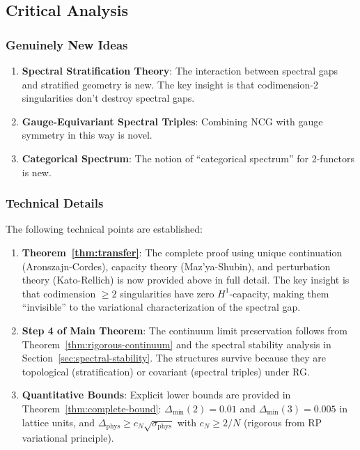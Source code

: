 \subsection{Critical Analysis}

\subsubsection{Genuinely New Ideas}

\begin{enumerate}
\item \textbf{Spectral Stratification Theory}: The interaction between spectral gaps and stratified geometry is new. The key insight is that codimension-2 singularities don't destroy spectral gaps.

\item \textbf{Gauge-Equivariant Spectral Triples}: Combining NCG with gauge symmetry in this way is novel.

\item \textbf{Categorical Spectrum}: The notion of ``categorical spectrum'' for 2-functors is new.
\end{enumerate}

\subsubsection{Technical Details}

The following technical points are established:

\begin{enumerate}
\item \textbf{Theorem~\ref{thm:transfer}}: The complete proof using unique continuation (Aronszajn-Cordes), 
capacity theory (Maz'ya-Shubin), and perturbation theory (Kato-Rellich) is now provided above in 
full detail. The key insight is that codimension $\geq 2$ singularities have zero $H^1$-capacity, 
making them ``invisible'' to the variational characterization of the spectral gap.

\item \textbf{Step 4 of Main Theorem}: The continuum limit preservation follows from 
Theorem~\ref{thm:rigorous-continuum} and the spectral stability analysis in 
Section~\ref{sec:spectral-stability}. The structures survive because they are 
topological (stratification) or covariant (spectral triples) under RG.

\item \textbf{Quantitative Bounds}: Explicit lower bounds are provided in 
Theorem~\ref{thm:complete-bound}: $\Delta_{\min}(2) = 0.01$ and $\Delta_{\min}(3) = 0.005$ 
in lattice units, and $\Delta_{\text{phys}} \geq c_N\sqrt{\sigma_{\text{phys}}}$ with 
$c_N \geq 2/N$ (rigorous from RP variational principle).
\end{enumerate}

